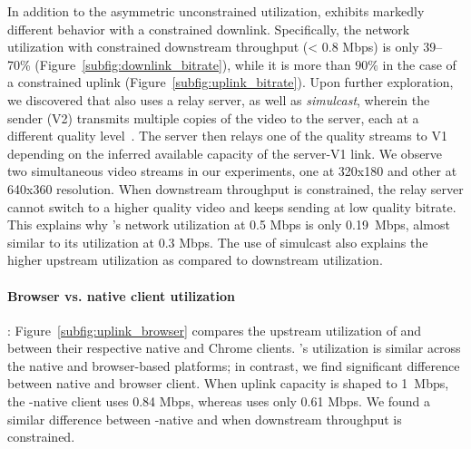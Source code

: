 In addition to the asymmetric unconstrained utilization, \meet exhibits
markedly different behavior with a constrained downlink.
Specifically, the
network utilization with constrained downstream throughput (< 0.8 Mbps) is
only 39--70\%
(Figure~\ref{subfig:downlink_bitrate}), while it is more than $90\%$ in the
case of a constrained uplink (Figure~\ref{subfig:uplink_bitrate}). Upon
further exploration, we discovered that
\meet also uses a relay server, as well as
\textit{simulcast}, wherein the sender (V2) transmits multiple copies of the
video to the server, each at a different quality
level~\cite{nistico2020comparative}. The server then relays one of the quality
streams to V1 depending on the inferred available capacity of the server-V1
link. We observe two simultaneous video streams in our experiments, one at
320x180 and other at 640x360 resolution. When downstream throughput is
constrained, the relay
server cannot switch to a higher quality video and keeps sending at low
quality bitrate. This explains why \meet's network utilization at 0.5 Mbps is
only 0.19~Mbps, almost similar to its utilization at 0.3 Mbps.  The use of
simulcast also explains the higher upstream utilization as compared to
downstream utilization. 

\paragraph{Browser vs. native client utilization}:
Figure~\ref{subfig:uplink_browser} compares the upstream utilization of \zoom
and \teams between their respective native and Chrome clients. \zoom's
utilization is similar across the native and browser-based platforms; in
contrast, we find significant difference between \teams native and browser
client. When uplink capacity is shaped to 1~Mbps, the \teams-native client
uses 0.84 Mbps, whereas \teamsbrowser uses only 0.61 Mbps. We found a
similar difference between \teams-native and \teamsbrowser when downstream
throughput is constrained. 

